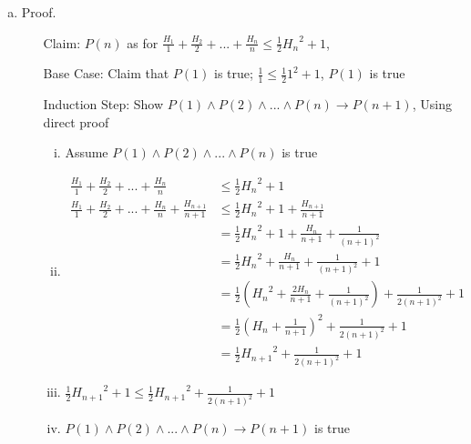 \documentclass{article}
\def\math#1{$#1$}
\begin{document}
\begin{enumerate}[(a)]
    \item Proof. \ \begin{itemize}
            \item [Claim: ] \math{P(n)} as for \math{\frac{H_1}{1} + \frac{H_2}{2} + ... + \frac{H_n}{n} \leq \frac{1}{2}{H_n}^2 + 1}, 
            \item [Base Case: ] Claim that \math{P(1)} is true; \math{\frac{1}{1} \leq \frac{1}{2}1^2+1}, \math{P(1)} is true
            \item [Induction Step: ] Show \math{P(1)\land P(2)\land ... \land P(n) \to P(n+1)}, Using direct proof 
                \begin{enumerate}[i)]
                    \item Assume \math{P(1)\land P(2)\land ... \land P(n)} is true
                    \item \begin{equation}
                            \begin{split}
                                        \frac{H_1}{1} + \frac{H_2}{2} + ... + \frac{H_n}{n} & \leq \frac{1}{2}{H_n}^2 + 1 \\
                                        \frac{H_1}{1} + \frac{H_2}{2} + ... + \frac{H_n}{n} + \frac{H_{n+1}}{n+1} & \leq \frac{1}{2}{H_n}^2 + 1 + \frac{H_{n+1}}{n+1} \\
                                        & = \frac{1}{2}{H_n}^2 + 1 + \frac{H_n}{n+1} + \frac{1}{{(n+1)}^2} \\
                                        & = \frac{1}{2}{H_n}^2 + \frac{H_n}{n+1} + \frac{1}{{(n+1)}^2}+ 1 \\
                                        & = \frac{1}{2}({H_n}^2 + \frac{2H_n}{n+1} + \frac{1}{{(n+1)}^2}) + \frac{1}{2{(n+1)}^2} + 1 \\
                                        & = \frac{1}{2}{(H_n + \frac{1}{n+1})}^2 + \frac{1}{2{(n+1)}^2} + 1 \\ 
                                        & = \frac{1}{2}{H_{n+1}}^2 + \frac{1}{2{(n+1)}^2} + 1
                                \end{split}
                        \end{equation}
                    \item \math{\frac{1}{2}{H_{n+1}}^2 + 1 \leq \frac{1}{2}{H_{n+1}}^2 + \frac{1}{2{(n+1)}^2} + 1}
                    \item \math{P(1)\land P(2)\land ... \land P(n) \to P(n+1)} is true

\end{enumerate}
\end{itemize}
\end{enumerate}
\end{document}
